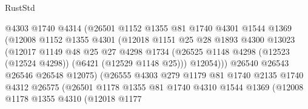 \begin{lexlean}{RustStd}
\begin{coremodule}
                              @4303
                              @1740
                              @4314
                              (@26501
                                @1152
                                @1355
                                @81
                                @1740
                                @4301
                                @1544
                                @1369
                                (@12008
                                  @1152
                                  @1355
                                  @4301
                                  (@12018
                                    @1151
                                    @25
                                    @28
                                    @1893
                                    @4300
                                    @13023
                                    (@12017
                                      @1149
                                      @48
                                      @25
                                      @27
                                      @4298
                                      @1734
                                      (@26525
                                        @1148
                                        @4298
                                        (@12523 (@12524 @4298))
                                        (@6421 (@12529 @1148 @25)))
                                      @12054)))
                                @26540
                                @26543
                                @26546
                                @26548
                                @12075)
                              (@26555
                                @4303
                                @279
                                @1179
                                @81
                                @1740
                                @2135
                                @1740
                                @4312
                                @26575
                                (@26501
                                  @1178
                                  @1355
                                  @81
                                  @1740
                                  @4310
                                  @1544
                                  @1369
                                  (@12008
                                    @1178
                                    @1355
                                    @4310
                                    (@12018
                                      @1177

\end{coremodule}
\end{lexlean}
